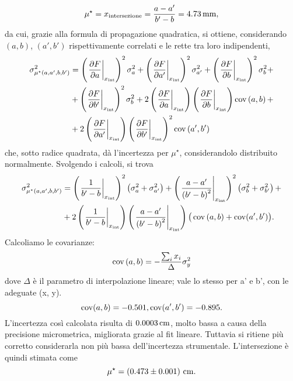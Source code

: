 \[ \mu ^{\star} = x_{\mathrm{intersezione}} = \frac{a - a'}{b' - b}  = 4.73 \,\mathrm{mm} , \]
da cui, grazie alla formula di propagazione quadratica, si ottiene, considerando $\left(a, b\right)$, $\left(a', b'\right)$ rispettivamente correlati e le rette tra loro indipendenti,
\begin{equation*}
\begin{split} %
	\sigma^2_{\mu ^{\star}\left(a, a', b, b'\right)}  &= \left(\left.\frac{\partial F}{\partial a}\right|_{x_{\mathrm{int}}}\right)^2   \sigma^2_{a} + \left(\left.\frac{\partial F}{\partial a'}\right|_{x_{\mathrm{int}}}\right)^2   \sigma^2_{a'} + \left(\left.\frac{\partial F}{\partial b}\right|_{x_{\mathrm{int}}}\right)^2   \sigma^2_{b} +\\
								&+ \left(\left.\frac{\partial F}{\partial b'}\right|_{x_{\mathrm{int}}}\right)^2   \sigma^2_{b} + 2\left(\left.\frac{\partial F}{\partial a}\right|_{x_{\mathrm{int}}}\right)\left(\left.\frac{\partial F}{\partial b}\right|_{x_{\mathrm{int}}}\right)   \cov\left(a, b\right) + \\
								&+ 2\left(\left.\frac{\partial F}{\partial a'}\right|_{x_{\mathrm{int}}}\right)\left(\left.\frac{\partial F}{\partial b'}\right|_{x_{\mathrm{int}}}\right)^2   \cov \left(a', b'\right)
\end{split}
\end{equation*}
che, sotto radice quadrata, d\`a l'incertezza per $ \mu ^{\star} $, considerandolo distribuito normalmente.
Svolgendo i calcoli, si trova
\begin{equation}
\begin{split}
\sigma^2_{\mu ^{\star}\left(a, a', b, b'\right)}  &= \left(\left.\frac{1}{b'- b}\right|_{x_{\mathrm{int}}}\right)^2   \left(\sigma^2_{a} + \sigma^2_{a'}\right) + \left(\left.\frac{a - a'}{\left(b' - b\right)^2}\right|_{x_{\mathrm{int}}}\right)^2 \left(\sigma^2_{b} + \sigma^2_{b'}\right) + \\
							&+ 2 \left(\left.\frac{1}{b'- b}\right|_{x_{\mathrm{int}}}\right) \left(\left.\frac{a - a'}{\left(b' - b\right)^2}\right|_{x_{\mathrm{int}}}\right) \big(\operatorname{cov}\left(a, b\right) + \operatorname{cov}(a', b') \big).
\end{split}
\end{equation}
Calcoliamo le covarianze:
\[ \operatorname{cov}\left(a, b\right) = -\frac{\sum_{i} x_i}{\Delta}\sigma_y^2 \] 
dove $\Delta$ \`e il parametro di interpolazione lineare; vale lo stesso per a' e b', con le adeguate (x, y).
\[ \operatorname{cov}(a, b) = -0.501 , \operatorname{cov}(a', b') = -0.895 . \]
L'incertezza cos\`i calcolata risulta di $0.0003\,\mathrm{cm}$, molto bassa a causa della precisione micrometrica, migliorata grazie al fit lineare. Tuttavia si ritiene pi\`u corretto considerarla non pi\`u bassa dell'incertezza strumentale. L'intersezione \`e quindi stimata come
\[ \mu ^{\star} =  \left(0.473 \pm 0.001\right) \,\mathrm{cm}. \] %

